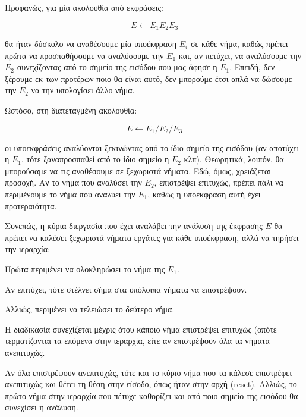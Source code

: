 Προφανώς, για μία ακολουθία από εκφράσεις:

\begin{equation}
	E \leftarrow E_1 E_2 E_3
\end{equation}

θα ήταν δύσκολο να αναθέσουμε μία υποέκφραση $E_i$ σε κάθε νήμα, καθώς πρέπει πρώτα να προσπαθήσουμε να αναλύσουμε την $E_1$ και, αν πετύχει, να αναλύσουμε την $E_2$ συνεχίζοντας από το σημείο της εισόδου που μας άφησε η $E_1$. 
Επειδή, δεν ξέρουμε εκ των προτέρων ποιο θα είναι αυτό, δεν μπορούμε έτσι απλά να δώσουμε την $E_2$ να την υπολογίσει άλλο νήμα.

Ωστόσο, στη διατεταγμένη ακολουθία:

\begin{equation}
	E \leftarrow E_1 / E_2 /  E_3
\end{equation}

οι υποεκφράσεις αναλύονται ξεκινώντας από το ίδιο σημείο της εισόδου (αν αποτύχει η $E_1$, τότε ξαναπροσπαθεί από το ίδιο σημείο η $E_2$ κλπ).
Θεωρητικά, λοιπόν, θα μπορούσαμε να τις αναθέσουμε σε ξεχωριστά νήματα.
Εδώ, όμως, χρειάζεται προσοχή.
Αν το νήμα που αναλύσει την $E_2$, επιστρέψει επιτυχώς, πρέπει πάλι να περιμένουμε το νήμα που αναλύει την $E_1$, καθώς η υποέκφραση αυτή έχει προτεραιότητα.

Συνεπώς, η κύρια διεργασία που έχει αναλάβει την ανάλυση της έκφρασης $E$ θα πρέπει να καλέσει ξεχωριστά νήματα-εργάτες για κάθε υποέκφραση, αλλά να τηρήσει την ιεραρχία:

\begin{description}[font=$\bullet$\scshape\bfseries]
	\item Πρώτα περιμένει να ολοκληρώσει το νήμα της $E_1$.
	\item Αν επιτύχει, τότε στέλνει σήμα στα υπόλοιπα νήματα να επιστρέψουν.
	\item Αλλιώς, περιμένει να τελειώσει το δεύτερο νήμα.
	\item Η διαδικασία συνεχίζεται μέχρις ότου κάποιο νήμα επιστρέψει επιτυχώς (οπότε τερματίζονται τα 
			επόμενα στην ιεραρχία, είτε αν επιστρέψουν όλα τα νήματα ανεπιτυχώς. %
\end{description}

Αν όλα επιστρέψουν ανεπιτυχώς, τότε και το κύριο νήμα που τα κάλεσε επιστρέφει ανεπιτυχώς και θέτει τη θέση στην είσοδο, όπως ήταν στην αρχή (reset).
Αλλιώς, το πρώτο νήμα στην ιεραρχία που πέτυχε καθορίζει και από ποιο σημείο της εισόδου θα συνεχίσει η ανάλυση.

